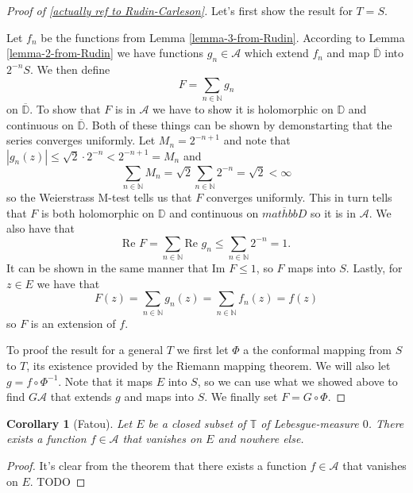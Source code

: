 \documentclass[a4paper,12pt,twoside,BCOR=10mm]{scrbook}
\newtheorem{corollary}{Corollary}
\renewcommand{\Re}{\text{Re }}
\renewcommand{\Im}{\text{Im }}
\begin{document}
\begin{proof}[Proof of \ref{actually ref to Rudin-Carleson}] %
Let's first show the result for $T = S$.

Let $f_n$ be the functions from Lemma \ref{lemma-3-from-Rudin}. %
According to Lemma \ref{lemma-2-from-Rudin} we have functions $g_n \in \mathcal{A}$ which extend $f_n$ and map $\overline{\mathbb{D}}$ into $2^{-n}S$.
We then define
\[
	F = \sum_{n \in \mathbb{N}} g_n
\]
on $\overline{\mathbb{D}}$.
To show that $F$ is in $\mathcal{A}$ we have to show it is holomorphic on $\mathbb{D}$ and continuous on $\overline{\mathbb{D}}$.
Both of these things can be shown by demonstarting that the series converges uniformly.
Let $M_n = 2^{-n + 1}$ and note that $|g_n(z)| \leq \sqrt{2}\cdot 2^{-n} < 2^{-n + 1} = M_n$ and
\[
	\sum_{n \in \mathbb{N}} M_n
	=
	\sqrt{2}\sum_{n \in \mathbb{N}} 2^{-n} =
	\sqrt{2} < \infty
\]
so the Weierstrass M-test tells us that $F$ converges uniformly. %
This in turn tells that $F$ is both holomorphic on $\mathbb{D}$ and continuous on $\overline{mathbb{D}}$ so it is in $\mathcal{A}$.
We also have that
\[
	\Re F = \sum_{n \in \mathbb{N}} \Re g_n \leq \sum_{n \in \mathbb{N}} 2^{-n} = 1.
\]
It can be shown in the same manner that $\Im F \leq 1$, so $F$ maps into $S$.
Lastly, for $z \in E$ we have that
\[
	F(z) = \sum_{n \in \mathbb{N}} g_n(z) = \sum_{n \in \mathbb{N}} f_n(z) = f(z)
\]
so $F$ is an extension of $f$.

To proof the result for a general $T$ we first let $\Phi$ a the conformal mapping from $S$ to $T$, its existence provided by the Riemann mapping theorem. %
We will also let $g = f \circ \Phi^{-1}$.
Note that it maps $E$ into $S$, so we can use what we showed above to find $G \mathcal{A}$ that extends $g$ and maps into $S$.
We finally set $F = G \circ \Phi$.
\end{proof}
\begin{corollary}[Fatou]
Let $E$ be a closed subset of $\mathbb{T}$ of Lebesgue-measure $0$.
There exists a function $f \in \mathcal{A}$ that vanishes on $E$ and nowhere else.
\end{corollary}
\begin{proof}
It's clear from the theorem %
that there exists a function $f \in \mathcal{A}$ that vanishes on $E$.
TODO
\end{proof}
\end{document}
